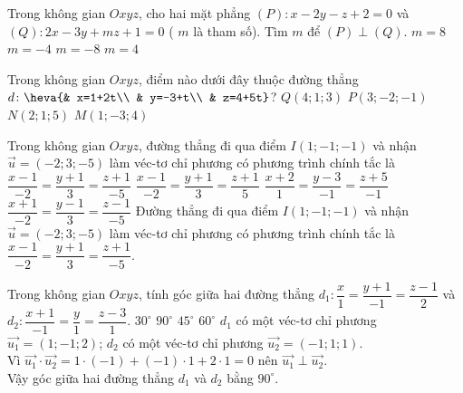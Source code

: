 \begin{ex}%
	Trong không gian $Oxyz$, cho hai mặt phẳng $(P)\colon x-2y-z+2=0$ và $(Q)\colon 2x-3y+mz+1=0$ ( $m$ là tham số). Tìm $m$ để $(P) \perp (Q)$.
	\choice
	{\True $m=8$}
	{$m=-4$}
	{$m=-8$}
	{$m=4$}
\end{ex}
\begin{ex}%
	Trong không gian $Oxyz$, điểm nào dưới đây thuộc đường thẳng $d\colon\heva{& x=1+2t\\ & y=-3+t\\ & z=4+5t}$?
	\choice
	{$Q(4;1;3)$}
	{$P(3;-2;-1)$}
	{$N(2;1;5)$}
	{\True $M(1;-3;4)$}
\end{ex}
\begin{ex}%
	Trong không gian $Oxyz$, đường thẳng đi qua điểm $I(1;-1;-1)$ và nhận $\overrightarrow{u}=(-2;3;-5)$ làm véc-tơ chỉ phương có phương trình chính tắc là
	\choice
	{\True $\dfrac{x-1}{-2} = \dfrac{y+1}{3} = \dfrac{z+1}{-5}$}
	{$\dfrac{x-1}{-2} = \dfrac{y+1}{3} = \dfrac{z+1}{5}$}
	{$\dfrac{x+2}{1} = \dfrac{y-3}{-1} = \dfrac{z+5}{-1}$}
	{$\dfrac{x+1}{-2} = \dfrac{y-1}{3} = \dfrac{z-1}{-5}$}
	\loigiai
	{Đường thẳng đi qua điểm $I(1;-1;-1)$ và nhận $\overrightarrow{u}=(-2;3;-5)$ làm véc-tơ chỉ phương có phương trình chính tắc là $\dfrac{x-1}{-2} = \dfrac{y+1}{3} = \dfrac{z+1}{-5}$.}
\end{ex}
\begin{ex}%
	Trong không gian $Oxyz$, tính góc giữa hai đường thẳng $d_1\colon \dfrac{x}{1}=\dfrac{y+1}{-1}=\dfrac{z-1}{2}$ và $d_2\colon\dfrac{x+1}{-1}=\dfrac{y}{1}=\dfrac{z-3}{1}$.
	\choice
	{$30^{\circ}$}
	{\True $90^{\circ}$}
	{$45^{\circ}$}
	{$60^{\circ}$}
	\loigiai
	{
		$d_1	$ có một véc-tơ chỉ phương $\overrightarrow{u_1}=(1;-1;2)$; $d_2$ có một véc-tơ chỉ phương $\overrightarrow{u_2}=(-1;1;1)$.\\
		Vì $\overrightarrow{u_1}\cdot\overrightarrow{u_2}= 1\cdot (-1)+(-1)\cdot 1+2\cdot 1=0$ nên $\overrightarrow{u_1}\perp\overrightarrow{u_2}$.\\
		Vậy góc giữa hai đường thẳng $d_1$ và $d_2$ bằng $90^{\circ}$.
	}
\end{ex}

